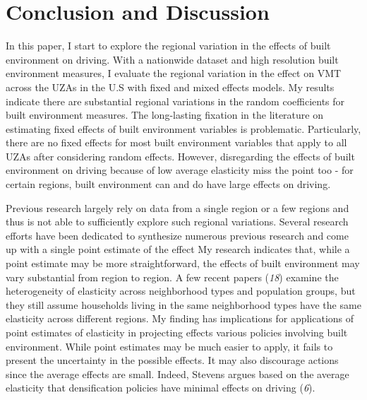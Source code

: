 \documentclass[numbered]{trbunofficial}
\begin{document}
\hypertarget{conclusion-and-discussion}{%
\section{Conclusion and Discussion}\label{conclusion-and-discussion}}

In this paper, I start to explore the regional variation in the effects of built environment on driving. With a nationwide dataset and high resolution built environment measures, I evaluate the regional variation in the effect on VMT across the UZAs in the U.S with fixed and mixed effects models. My results indicate there are substantial regional variations in the random coefficients for built environment measures. The long-lasting fixation in the literature on estimating fixed effects of built environment variables is problematic. Particularly, there are no fixed effects for most built environment variables that apply to all UZAs after considering random effects. However, disregarding the effects of built environment on driving because of low average elasticity miss the point too - for certain regions, built environment can and do have large effects on driving.

Previous research largely rely on data from a single region or a few regions and thus is not able to sufficiently explore such regional variations. Several research efforts have been dedicated to synthesize numerous previous research and come up with a single point estimate of the effect My research indicates that, while a point estimate may be more straightforward, the effects of built environment may vary substantial from region to region. A few recent papers (\emph{18}) examine the heterogeneity of elasticity across neighborhood types and population groups, but they still assume households living in the same neighborhood types have the same elasticity across different regions. My finding has implications for applications of point estimates of elasticity in projecting effects various policies involving built environment. While point estimates may be much easier to apply, it fails to present the uncertainty in the possible effects. It may also discourage actions since the average effects are small. Indeed, Stevens argues based on the average elasticity that densification policies have minimal effects on driving (\emph{6}).
\end{document}
